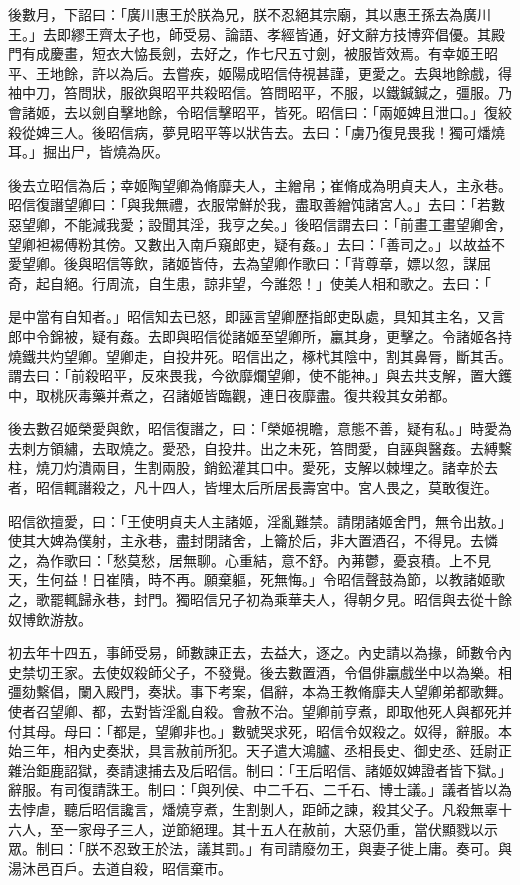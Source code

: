 \begin{pinyinscope}
後數月，下詔曰：「廣川惠王於朕為兄，朕不忍絕其宗廟，其以惠王孫去為廣川王。」去即繆王齊太子也，師受易、論語、孝經皆通，好文辭方技博弈倡優。其殿門有成慶畫，短衣大恊長劍，去好之，作七尺五寸劍，被服皆效焉。有幸姬王昭平、王地餘，許以為后。去嘗疾，姬陽成昭信侍視甚謹，更愛之。去與地餘戲，得袖中刀，笞問狀，服欲與昭平共殺昭信。笞問昭平，不服，以鐵鍼鍼之，彊服。乃會諸姬，去以劍自擊地餘，令昭信擊昭平，皆死。昭信曰：「兩姬婢且泄口。」復絞殺從婢三人。後昭信病，夢見昭平等以狀告去。去曰：「虜乃復見畏我！獨可燔燒耳。」掘出尸，皆燒為灰。

後去立昭信為后；幸姬陶望卿為脩靡夫人，主繒帛；崔脩成為明貞夫人，主永巷。昭信復譖望卿曰：「與我無禮，衣服常鮮於我，盡取善繒饨諸宮人。」去曰：「若數惡望卿，不能減我愛；設聞其淫，我亨之矣。」後昭信謂去曰：「前畫工畫望卿舍，望卿袒裼傅粉其傍。又數出入南戶窺郎吏，疑有姦。」去曰：「善司之。」以故益不愛望卿。後與昭信等飲，諸姬皆侍，去為望卿作歌曰：「背尊章，嫖以忽，謀屈奇，起自絕。行周流，自生患，諒非望，今誰怨！」使美人相和歌之。去曰：「

是中當有自知者。」昭信知去已怒，即誣言望卿歷指郎吏臥處，具知其主名，又言郎中令錦被，疑有姦。去即與昭信從諸姬至望卿所，臝其身，更擊之。令諸姬各持燒鐵共灼望卿。望卿走，自投井死。昭信出之，椓杙其陰中，割其鼻脣，斷其舌。謂去曰：「前殺昭平，反來畏我，今欲靡爛望卿，使不能神。」與去共支解，置大鑊中，取桃灰毒藥并煮之，召諸姬皆臨觀，連日夜靡盡。復共殺其女弟都。

後去數召姬榮愛與飲，昭信復譖之，曰：「榮姬視瞻，意態不善，疑有私。」時愛為去刺方領繡，去取燒之。愛恐，自投井。出之未死，笞問愛，自誣與醫姦。去縛繫柱，燒刀灼潰兩目，生割兩股，銷鈆灌其口中。愛死，支解以棘埋之。諸幸於去者，昭信輒譖殺之，凡十四人，皆埋太后所居長壽宮中。宮人畏之，莫敢復迕。

昭信欲擅愛，曰：「王使明貞夫人主諸姬，淫亂難禁。請閉諸姬舍門，無令出敖。」使其大婢為僕射，主永巷，盡封閉諸舍，上籥於后，非大置酒召，不得見。去憐之，為作歌曰：「愁莫愁，居無聊。心重結，意不舒。內茀鬱，憂哀積。上不見天，生何益！日崔隤，時不再。願棄軀，死無悔。」令昭信聲鼓為節，以教諸姬歌之，歌罷輒歸永巷，封門。獨昭信兄子初為乘華夫人，得朝夕見。昭信與去從十餘奴博飲游敖。

初去年十四五，事師受易，師數諫正去，去益大，逐之。內史請以為掾，師數令內史禁切王家。去使奴殺師父子，不發覺。後去數置酒，令倡俳臝戲坐中以為樂。相彊劾繫倡，闌入殿門，奏狀。事下考案，倡辭，本為王教脩靡夫人望卿弟都歌舞。使者召望卿、都，去對皆淫亂自殺。會赦不治。望卿前亨煮，即取他死人與都死并付其母。母曰：「都是，望卿非也。」數號哭求死，昭信令奴殺之。奴得，辭服。本始三年，相內史奏狀，具言赦前所犯。天子遣大鴻臚、丞相長史、御史丞、廷尉正雜治鉅鹿詔獄，奏請逮捕去及后昭信。制曰：「王后昭信、諸姬奴婢證者皆下獄。」辭服。有司復請誅王。制曰：「與列侯、中二千石、二千石、博士議。」議者皆以為去悖虐，聽后昭信讒言，燔燒亨煮，生割剝人，距師之諫，殺其父子。凡殺無辜十六人，至一家母子三人，逆節絕理。其十五人在赦前，大惡仍重，當伏顯戮以示眾。制曰：「朕不忍致王於法，議其罰。」有司請廢勿王，與妻子徙上庸。奏可。與湯沐邑百戶。去道自殺，昭信棄市。


\end{pinyinscope}
